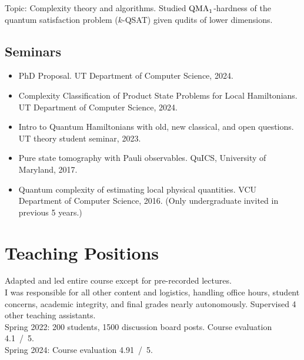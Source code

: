 \documentclass[11pt,letterpaper,serif]{moderncv}
\begin{document}
{
	\begin{adjustwidth}{.25in}{}
		Topic: Complexity theory and algorithms. Studied $\textup{QMA}_{1}$-hardness of the quantum satisfaction problem ($k$-QSAT) given qudits of lower dimensions.
	\end{adjustwidth}
}

\subsection{Seminars}

\begin{itemize}
	\item[\textbullet] PhD Proposal.\quad
	UT Department of Computer Science, 2024.

	\item[\textbullet] Complexity Classification of Product State Problems for Local Hamiltonians.\quad
	UT Department of Computer Science, 2024.

	\item[\textbullet] Intro to Quantum Hamiltonians with old, new classical, and open questions.\quad
	UT theory student seminar, 2023.

	\item[\textbullet] Pure state tomography with Pauli observables.\quad
	QuICS, University of Maryland, 2017.

	\item[\textbullet] Quantum complexity of estimating local physical quantities.\quad
	VCU Department of Computer Science, 2016.\quad
	(Only undergraduate invited in previous 5 years.)
\end{itemize}


\section{Teaching Positions}

{
	\begin{adjustwidth}{.25in}{}
		Adapted and led entire course except for pre-recorded lectures.\\
		I was responsible for all other content and logistics, handling office hours, student concerns, academic integrity, and final grades nearly autonomously.
		Supervised 4 other teaching assistants.\\
		Spring 2022: 200 students, 1500 discussion board posts. Course evaluation 4.1~/~5.
		\\ Spring 2024: Course evaluation 4.91~/~5.
	\end{adjustwidth}
}
\end{document}
